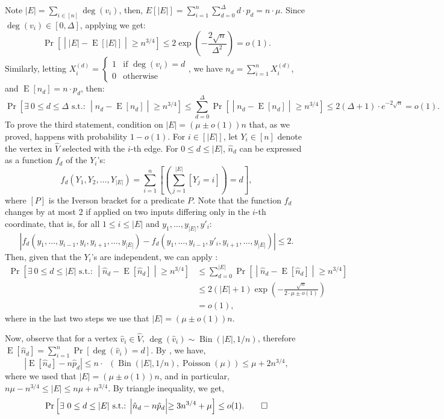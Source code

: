 \documentclass[11pt]{article}
\DeclareMathOperator*{\E}{E}
\DeclareMathOperator*{\Bin}{Bin}
\DeclareMathOperator*{\Poisson}{Poisson}
\DeclareMathOperator*{\dTV}{\textit{d}_{TV}}
\begin{document}
\begin{appendixproof}
Note $|E|=\sum_{i\in[n]} \deg(v_i)$, then, $E\left[|E|\right] = \sum_{i=1}^n \sum_{d=0}^{\Delta} d\cdot p_d = n\cdot \mu$. Since $\deg(v_i)\in[0,\Delta]$, applying  we get:
\[
\Pr\left[\middle| |E| - \E[|E|] \middle| \geq n^{3/4}\right] \leq 2 \exp\left(-\frac{2 \sqrt{n}}{\Delta^2}\right) = o(1).
\]
Similarly, letting $X_i^{(d)}=\begin{cases} 1 & \text{if $\deg(v_i)=d$} \\ 0 & \text{otherwise} \end{cases}$, we have $n_{d} = \sum_{i=1}^n X_i^{(d)}$, and $\E[n_{d}] = n\cdot p_d$, then:
\[
\Pr\left[\exists\ 0\leq d \leq \Delta \text{ s.t.: } \middle| n_d - \E[n_d] \middle| \geq n^{3/4} \right] \leq \sum_{d=0}^{\Delta} \Pr\left[\middle| n_d - \E[n_d] \middle| \geq n^{3/4} \right] \leq 2(\Delta+1)\cdot e^{-2\sqrt{n}} = o(1).
\]
To prove the third statement, condition on $|E|=(\mu \pm o(1))n$ that, as we proved, happens with probability $1-o(1)$. For $i\in[|E|]$, let $Y_i \in [n]$ denote the vertex in $\hat{V}$ selected with the $i$-th edge. For $0\leq d \leq |E|$, $\hat{n}_d$ can be expressed as a function $f_d$ of the $Y_i$'s: 
\[
f_d(Y_1, Y_2, \dots, Y_{|E|}) = \sum_{i=1}^n \left[\left(\sum_{j=1}^{|E|}[Y_j = i]\right) = d\right],
\] 
where $[P]$ is the Iverson bracket for a predicate $P$. Note that the function $f_d$ changes by at most 2 if applied on two inputs differing only in the $i$-th coordinate, that is, for all $1\leq i \leq |E|$ and $y_1, \dots, y_{|E|}, y'_i$:
\[
| f_d(y_1, \dots, y_{i-1}, y_i, y_{i+1}, \dots, y_{|E|}) - f_d(y_1, \dots, y_{i-1}, y'_i, y_{i+1}, \dots, y_{|E|})| \leq 2.
\]
Then, given that the $Y_i$'s are independent, we can apply :
\begin{align*}
\Pr\left[ \exists\ 0\leq d \leq |E| \text{ s.t.: } \middle| \hat{n}_d - \E[\hat{n}_d] \middle| \geq n^{3/4} \right] & \leq \sum_{d=0}^{|E|} \Pr\left[ \middle| \hat{n}_d - \E[\hat{n}_d] \middle| \geq n^{3/4} \right] \\
& \leq 2 (|E|+1) \exp\left(-\frac{\sqrt{n}}{2\cdot \mu \pm o(1)}\right)\\
& = o(1),
\end{align*}
where in the last two steps we use that $|E|=(\mu \pm o(1))n$. 

Now, observe that for a vertex $\hat{v}_i \in \hat{V}$, $\deg(\hat{v}_i) \sim \Bin(|E|, 1/n)$, therefore $\E[\hat{n}_d] = \sum_{i=1}^n \Pr[\deg(\hat{v}_i) = d]$. By , we have, 
\[
\left|\E[\hat{n}_d] - n \hat{p}_d\right| \leq n\cdot \dTV(\Bin(|E|,1/n), \Poisson(\mu)) \leq \mu + 2n^{3/4}, 
\]
where we used that $|E|=(\mu \pm o(1))n$, and in particular, $n\mu - n^{3/4} \leq |E|\leq n\mu + n^{3/4}$. By triangle inequality, we get,
\[
\Pr\left[ \exists\ 0\leq d \leq |E| \text{ s.t.: } \middle| \hat{n}_d - n\hat{p}_d \middle| \geq 3n^{3/4} + \mu \right] \leq o(1). \qedhere
\]
\end{appendixproof}
\end{document}
